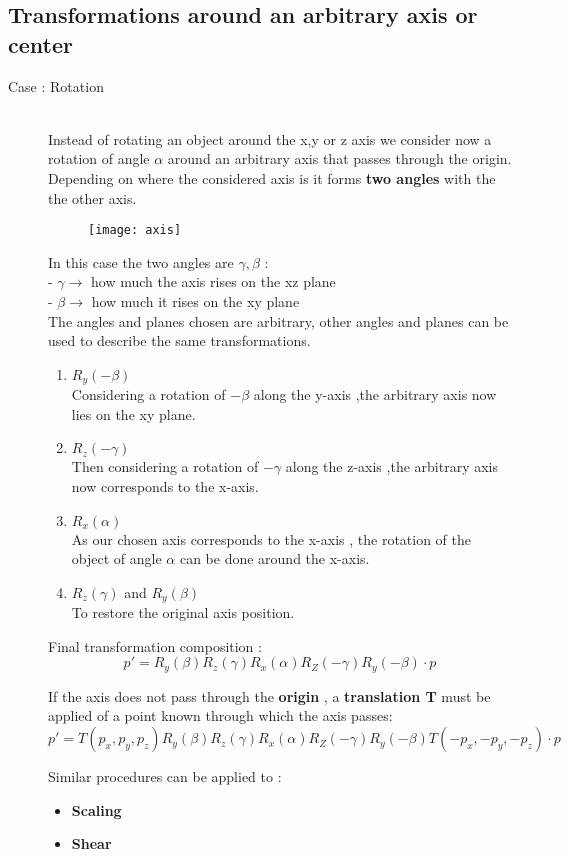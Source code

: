 \subsection{Transformations around an arbitrary axis or center}
\begin{description}
\item[Case : Rotation]\hfill\\
Instead of rotating an object around the x,y or z axis we consider now a rotation of angle $\alpha$ around an arbitrary axis that passes through the origin. Depending on where the considered axis is it forms \textbf{two angles} with the the other axis.
\begin{figure}[H]
  \centering
  \texttt{[image: axis]}
\end{figure}
In this case the two angles are $\gamma, \beta$ :\\
- $\gamma \to$ how much the axis rises on the xz plane\\
- $\beta \to$ how much it rises on the xy plane\\
The angles and planes chosen are arbitrary, other angles and planes can be used to describe the same transformations.
\begin{enumerate}
\item $R_y(-\beta)$\\
Considering a rotation of $-\beta$  along the y-axis ,the arbitrary axis now lies on the xy plane.
\item $R_z(-\gamma)$\\
Then considering a rotation of $-\gamma$ along the z-axis ,the arbitrary axis now corresponds to the x-axis.
\item $R_x(\alpha)$\\
As our chosen axis corresponds to the x-axis , the rotation of the object of angle $\alpha$ can be done around the x-axis.
\item $R_z(\gamma)$ and $R_y(\beta)$\\
To restore the original axis position.
\end{enumerate}
Final transformation composition :
\[
\boxed{p'=R_y(\beta)R_z(\gamma)R_x(\alpha)R_Z(-\gamma)R_y(-\beta) \cdot p}
\]

If the axis does not pass through the \textbf{origin} , a \textbf{translation T} must be applied of a point known through which the axis passes:
\[
\boxed{p'=T(p_x,p_y,p_z)R_y(\beta)R_z(\gamma)R_x(\alpha)R_Z(-\gamma)R_y(-\beta)T(-p_x,-p_y,-p_z) \cdot p}
\]

Similar procedures can be applied to :
\begin{itemize}
\item \textbf{Scaling}
\item \textbf{Shear}
\end{itemize}
\end{description}



